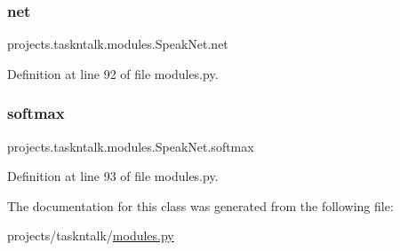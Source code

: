 \subsubsection{\texorpdfstring{net}{net}}
{\footnotesize\ttfamily projects.\+taskntalk.\+modules.\+Speak\+Net.\+net}



Definition at line 92 of file modules.\+py.

\mbox{\label{classprojects_1_1taskntalk_1_1modules_1_1SpeakNet_aa6d9a715cdd73868cd0d57f4e5e240e0}} 
\subsubsection{\texorpdfstring{softmax}{softmax}}
{\footnotesize\ttfamily projects.\+taskntalk.\+modules.\+Speak\+Net.\+softmax}



Definition at line 93 of file modules.\+py.



The documentation for this class was generated from the following file\+:\begin{DoxyCompactItemize}
\item 
projects/taskntalk/\hyperlink{projects_2taskntalk_2modules_8py}{modules.\+py}\end{DoxyCompactItemize}
